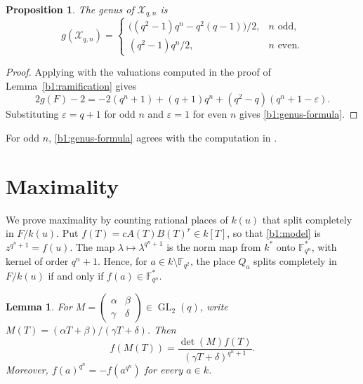\documentclass[12pt,reqno]{amsart}
\numberwithin{equation}{section}
\newcommand{\F}{\mathbb F}
\DeclareMathOperator{\GL}{GL}
\theoremstyle{plain}
\newtheorem{proposition}[theorem]{Proposition}
\newtheorem{lemma}[theorem]{Lemma}
\theoremstyle{definition}
\theoremstyle{remark}
\begin{document}
\begin{proposition}
\label{b1:genus}
The genus of \(\mathcal X_{q,n}\) is
\begin{equation}
\label{b1:genus-formula}
 g(\mathcal X_{q,n})=
 \begin{cases}
 \bigl((q^2-1)q^n-q^2(q-1)\bigr)/2,&n\text{ odd},\\
 (q^2-1)q^n/2,&n\text{ even}.
 \end{cases}
\end{equation}
\end{proposition}

\begin{proof}
Applying \cite[Corollary~3.7.4]{Stichtenoth2009} with the valuations
computed in the proof of Lemma~\ref{b1:ramification} gives
\[
 2g(F)-2=-2(q^n+1)+(q+1)q^n+(q^2-q)(q^n+1-\varepsilon).
\]
Substituting \(\varepsilon=q+1\) for odd \(n\) and
\(\varepsilon=1\) for even \(n\) gives
\eqref{b1:genus-formula}.
\end{proof}

For odd \(n\), \eqref{b1:genus-formula} agrees with the computation in
\cite[Proposition~2.1]{BM2018}.


\section{Maximality}
\label{b1:maximality-section}

We prove maximality by counting rational places of \(k(u)\) that split
completely in \(F/k(u)\). Put \(f(T)=cA(T)B(T)^r\in k[T]\), so that
\eqref{b1:model} is \(z^{q^n+1}=f(u)\).
The map \(\lambda\mapsto\lambda^{q^n+1}\) is the norm map
from \(k^*\) onto \(\F_{q^n}^*\), with kernel of order \(q^n+1\).
Hence, for \(a\in k\setminus\F_{q^2}\), the place \(Q_a\) splits
completely in \(F/k(u)\) if and only if \(f(a)\in\F_{q^n}^*\).

\begin{lemma}
\label{b1:mobius-identities}
For \(M=\left(\begin{smallmatrix}\alpha&\beta\\\gamma&\delta\end{smallmatrix}\right)
\in\GL_2(q)\), write \(M(T)=(\alpha T+\beta)/(\gamma T+\delta)\).  Then
\begin{equation}
\label{b1:mobius-f}
 f(M(T))=\frac{\det(M)f(T)}{(\gamma T+\delta)^{q^n+1}}.
\end{equation}
Moreover, \(f(a)^{q^n}=-f(a^{q^n})\) for every \(a\in k\).
\end{lemma}
\end{document}
